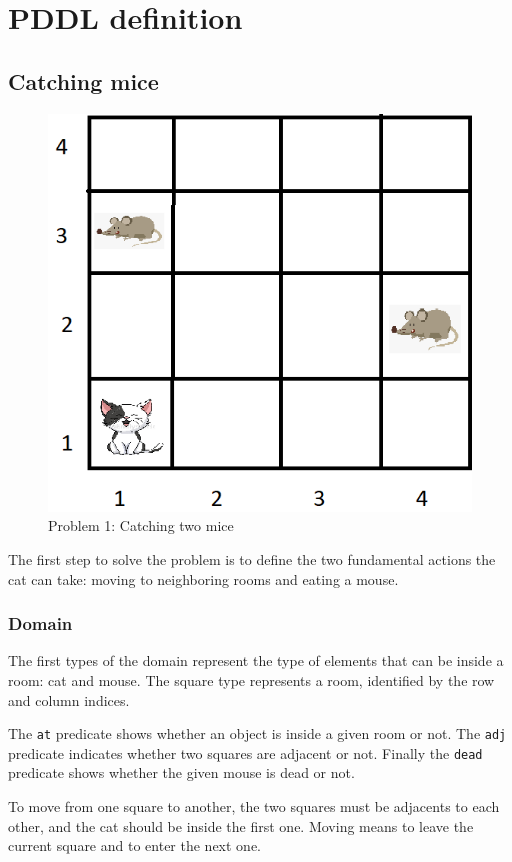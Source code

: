 \section{PDDL definition}

\subsection{Catching mice}

\begin{figure}[ht]
    \centering
    \includegraphics[width=.5\linewidth]{fig/A3/cat_01.png}
    \caption{Problem 1: Catching two mice}
    \label{fig:cat_01}
\end{figure}

The first step to solve the problem is to define the two fundamental actions the cat can take: moving to neighboring rooms and eating a mouse.


\subsubsection{Domain}

The first types of the domain represent the type of elements that can be inside a room: cat and mouse. The square type represents a room, identified by the row and column indices.

The \verb|at| predicate shows whether an object is inside a given room or not. The \verb|adj| predicate indicates whether two squares are adjacent or not. Finally the \verb|dead| predicate shows whether the given mouse is dead or not.




To move from one square to another, the two squares must be adjacents to each other, and the cat should be inside the first one. Moving means to leave the current square and to enter the next one.


